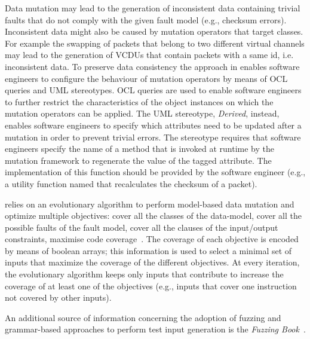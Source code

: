 Data mutation may lead to the generation of inconsistent data containing trivial faults that do not comply with the given fault model (e.g., checksum errors). 
Inconsistent data might also be caused by mutation operators that target classes. For example the swapping of packets that belong to two different virtual channels may lead to the generation of VCDUs that contain packets with a same id, i.e. inconsistent data. To preserve data consistency the approach in \cite{di2015generating} enables software engineers to configure the behaviour of mutation operators by means of OCL queries and UML stereotypes. OCL queries are used to enable software engineers to further restrict the characteristics of the object instances on which the mutation operators can be applied.   The UML stereotype, \emph{Derived}, instead, enables software engineers to specify which attributes need to be updated after a mutation in order to prevent trivial errors. The stereotype requires that software engineers specify the name of a method that is invoked at runtime by the mutation framework to regenerate the value of the tagged attribute. The implementation of this function should be provided by the software engineer (e.g., a utility function named that recalculates the checksum of a packet). 


 relies on an evolutionary algorithm to perform model-based data mutation and optimize multiple objectives:  
cover all the classes of the data-model, cover all the possible faults of the fault model, cover all the clauses of the input/output constraints,
maximise code coverage~\cite{di2015evolutionary}.
The coverage of each objective is encoded by means of boolean arrays; this information is used to select a minimal set of inputs that maximize the coverage of the different objectives.
At every iteration, the evolutionary algorithm keeps only inputs that contribute to increase the coverage of at least one of the objectives (e.g., inputs that cover one instruction not covered by other inputs).

An additional source of information concerning the adoption of fuzzing and grammar-based approaches to perform test input generation is the \emph{Fuzzing Book}~\cite{fuzzingbook2019:GrammarFuzzer}.


\clearpage